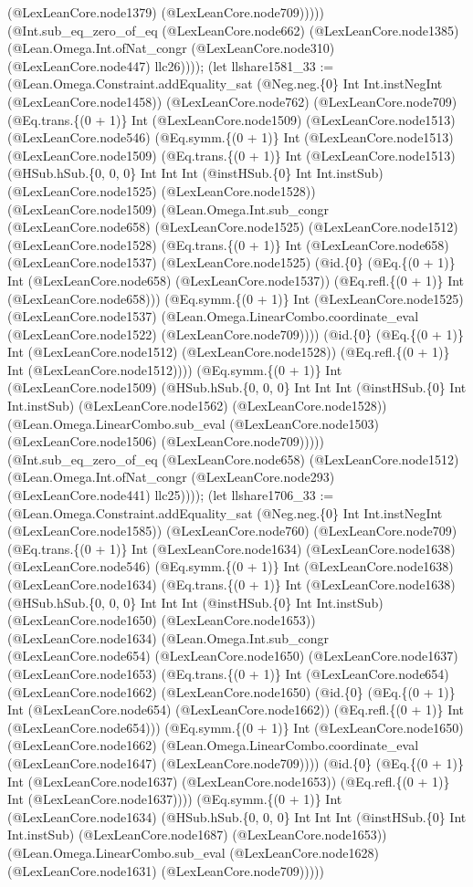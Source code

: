 \documentclass[11pt]{article}
\begin{document}
(@LexLeanCore.node1379) (@LexLeanCore.node709))))) (@Int.sub\_eq\_zero\_of\_eq (@LexLeanCore.node662) (@LexLeanCore.node1385) (@Lean.Omega.Int.ofNat\_congr (@LexLeanCore.node310) (@LexLeanCore.node447) llc26)))); (let llshare1581\_33 := (@Lean.Omega.Constraint.addEquality\_sat (@Neg.neg.\{0\} Int Int.instNegInt (@LexLeanCore.node1458)) (@LexLeanCore.node762) (@LexLeanCore.node709) (@Eq.trans.\{(0 + 1)\} Int (@LexLeanCore.node1509) (@LexLeanCore.node1513) (@LexLeanCore.node546) (@Eq.symm.\{(0 + 1)\} Int (@LexLeanCore.node1513) (@LexLeanCore.node1509) (@Eq.trans.\{(0 + 1)\} Int (@LexLeanCore.node1513) (@HSub.hSub.\{0, 0, 0\} Int Int Int (@instHSub.\{0\} Int Int.instSub) (@LexLeanCore.node1525) (@LexLeanCore.node1528)) (@LexLeanCore.node1509) (@Lean.Omega.Int.sub\_congr (@LexLeanCore.node658) (@LexLeanCore.node1525) (@LexLeanCore.node1512) (@LexLeanCore.node1528) (@Eq.trans.\{(0 + 1)\} Int (@LexLeanCore.node658) (@LexLeanCore.node1537) (@LexLeanCore.node1525) (@id.\{0\} (@Eq.\{(0 + 1)\} Int (@LexLeanCore.node658) (@LexLeanCore.node1537)) (@Eq.refl.\{(0 + 1)\} Int (@LexLeanCore.node658))) (@Eq.symm.\{(0 + 1)\} Int (@LexLeanCore.node1525) (@LexLeanCore.node1537) (@Lean.Omega.LinearCombo.coordinate\_eval (@LexLeanCore.node1522) (@LexLeanCore.node709)))) (@id.\{0\} (@Eq.\{(0 + 1)\} Int (@LexLeanCore.node1512) (@LexLeanCore.node1528)) (@Eq.refl.\{(0 + 1)\} Int (@LexLeanCore.node1512)))) (@Eq.symm.\{(0 + 1)\} Int (@LexLeanCore.node1509) (@HSub.hSub.\{0, 0, 0\} Int Int Int (@instHSub.\{0\} Int Int.instSub) (@LexLeanCore.node1562) (@LexLeanCore.node1528)) (@Lean.Omega.LinearCombo.sub\_eval (@LexLeanCore.node1503) (@LexLeanCore.node1506) (@LexLeanCore.node709))))) (@Int.sub\_eq\_zero\_of\_eq (@LexLeanCore.node658) (@LexLeanCore.node1512) (@Lean.Omega.Int.ofNat\_congr (@LexLeanCore.node293) (@LexLeanCore.node441) llc25)))); (let llshare1706\_33 := (@Lean.Omega.Constraint.addEquality\_sat (@Neg.neg.\{0\} Int Int.instNegInt (@LexLeanCore.node1585)) (@LexLeanCore.node760) (@LexLeanCore.node709) (@Eq.trans.\{(0 + 1)\} Int (@LexLeanCore.node1634) (@LexLeanCore.node1638) (@LexLeanCore.node546) (@Eq.symm.\{(0 + 1)\} Int (@LexLeanCore.node1638) (@LexLeanCore.node1634) (@Eq.trans.\{(0 + 1)\} Int (@LexLeanCore.node1638) (@HSub.hSub.\{0, 0, 0\} Int Int Int (@instHSub.\{0\} Int Int.instSub) (@LexLeanCore.node1650) (@LexLeanCore.node1653)) (@LexLeanCore.node1634) (@Lean.Omega.Int.sub\_congr (@LexLeanCore.node654) (@LexLeanCore.node1650) (@LexLeanCore.node1637) (@LexLeanCore.node1653) (@Eq.trans.\{(0 + 1)\} Int (@LexLeanCore.node654) (@LexLeanCore.node1662) (@LexLeanCore.node1650) (@id.\{0\} (@Eq.\{(0 + 1)\} Int (@LexLeanCore.node654) (@LexLeanCore.node1662)) (@Eq.refl.\{(0 + 1)\} Int (@LexLeanCore.node654))) (@Eq.symm.\{(0 + 1)\} Int (@LexLeanCore.node1650) (@LexLeanCore.node1662) (@Lean.Omega.LinearCombo.coordinate\_eval (@LexLeanCore.node1647) (@LexLeanCore.node709)))) (@id.\{0\} (@Eq.\{(0 + 1)\} Int (@LexLeanCore.node1637) (@LexLeanCore.node1653)) (@Eq.refl.\{(0 + 1)\} Int (@LexLeanCore.node1637)))) (@Eq.symm.\{(0 + 1)\} Int (@LexLeanCore.node1634) (@HSub.hSub.\{0, 0, 0\} Int Int Int (@instHSub.\{0\} Int Int.instSub) (@LexLeanCore.node1687) (@LexLeanCore.node1653)) (@Lean.Omega.LinearCombo.sub\_eval (@LexLeanCore.node1628) (@LexLeanCore.node1631) (@LexLeanCore.node709))))) 
\end{document}
